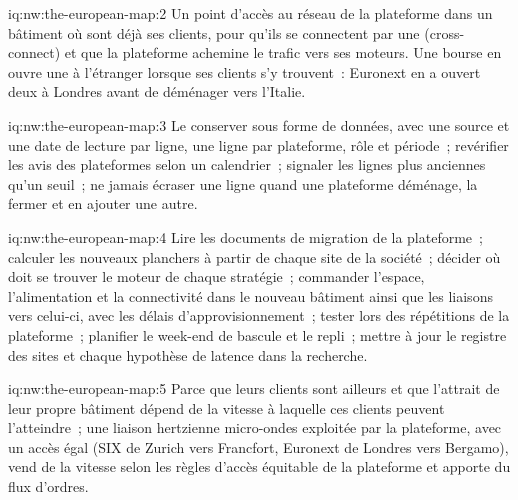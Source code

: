 \begin{solution}{iq:nw:the-european-map:2}
Un point d'accès au réseau de la plateforme dans un bâtiment où sont déjà ses clients, pour qu'ils se connectent par une  (cross-connect) et que la plateforme
achemine le trafic vers ses moteurs. Une bourse en ouvre une à l'étranger lorsque ses clients s'y trouvent~: Euronext en a ouvert deux à Londres avant de déménager vers
l'Italie.
\end{solution}

\begin{solution}{iq:nw:the-european-map:3}
Le conserver sous forme de données, avec une source et une date de lecture par ligne, une ligne par plateforme, rôle et période~; revérifier les avis des plateformes selon un
calendrier~; signaler les lignes plus anciennes qu'un seuil~; ne jamais écraser une ligne quand une plateforme déménage, la fermer et en ajouter une autre.
\end{solution}

\begin{solution}{iq:nw:the-european-map:4}
Lire les documents de migration de la plateforme~; calculer les nouveaux planchers à partir de chaque site de la société~; décider où doit se trouver le moteur de chaque stratégie~;
commander l'espace, l'alimentation et la connectivité dans le nouveau bâtiment ainsi que les liaisons vers celui-ci, avec les délais d'approvisionnement~; tester lors des répétitions de la plateforme~; planifier le week-end de bascule
et le repli~; mettre à jour le registre des sites et chaque hypothèse de latence dans la recherche.
\end{solution}

\begin{solution}{iq:nw:the-european-map:5}
Parce que leurs clients sont ailleurs et que l'attrait de leur propre bâtiment dépend de la vitesse à laquelle ces clients peuvent l'atteindre~; une liaison hertzienne
micro-ondes exploitée par la plateforme, avec un accès égal (SIX de Zurich vers Francfort, Euronext de Londres vers Bergamo), vend de la vitesse selon les règles d'accès équitable de la plateforme et
apporte du flux d'ordres.
\end{solution}

